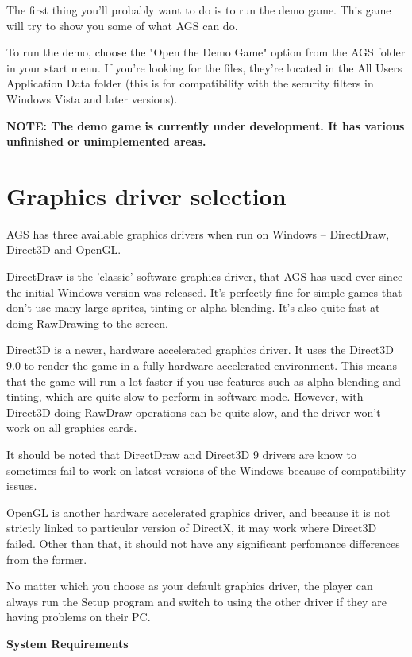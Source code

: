 The first thing you'll probably want to do is to run the demo game. This
game will try to show you some of what AGS can do.

To run the demo, choose the "Open the Demo Game" option from the AGS folder
in your start menu. If you're looking for the files, they're located in the
All Users Application Data folder (this is for compatibility with the security filters in Windows Vista and later versions).

\bf{NOTE:} The demo game is currently under development. It has various unfinished
or unimplemented areas.



\section{Graphics driver selection}\label{GraphicsDriver}%

AGS has three available graphics drivers when run on Windows -- DirectDraw, Direct3D and OpenGL.

DirectDraw is the 'classic' software graphics driver, that AGS has used ever since
the initial Windows version was released. It's perfectly fine for simple games
that don't use many large sprites, tinting or alpha blending. It's also quite fast
at doing RawDrawing to the screen.

Direct3D is a newer, hardware accelerated graphics driver. It uses the Direct3D 9.0 to
render the game in a fully hardware-accelerated environment. This means that the
game will run a lot faster if you use features such as alpha blending and tinting,
which are quite slow to perform in software mode. However, with Direct3D doing RawDraw
operations can be quite slow, and the driver won't work on all graphics cards.

It should be noted that DirectDraw and Direct3D 9 drivers are know to sometimes fail to work on latest versions of the Windows because of compatibility issues.

OpenGL is another hardware accelerated graphics driver, and because it is not strictly linked to particular version of DirectX, it may work where Direct3D failed. Other than that, it should not have any significant perfomance differences from the former.

No matter which you choose as your default graphics driver, the player can always
run the Setup program and switch to using the other driver if they are having problems
on their PC.

\bf{System Requirements}

